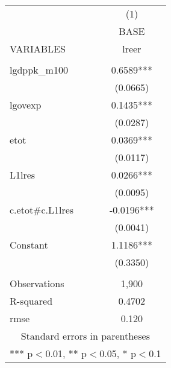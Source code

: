 \documentclass[]{article}
\begin{document}
\begin{tabular}{lc} \hline
 & (1) \\
 & BASE \\
VARIABLES & lreer \\ \hline
 &  \\
lgdppk\_m100 & 0.6589*** \\
 & (0.0665) \\
lgovexp & 0.1435*** \\
 & (0.0287) \\
etot & 0.0369*** \\
 & (0.0117) \\
L1lres & 0.0266*** \\
 & (0.0095) \\
c.etot\#c.L1lres & -0.0196*** \\
 & (0.0041) \\
Constant & 1.1186*** \\
 & (0.3350) \\
 &  \\
Observations & 1,900 \\
R-squared & 0.4702 \\
 rmse & 0.120 \\ \hline
\multicolumn{2}{c}{ Standard errors in parentheses} \\
\multicolumn{2}{c}{ *** p$<$0.01, ** p$<$0.05, * p$<$0.1} \\
\end{tabular}
\end{document}
